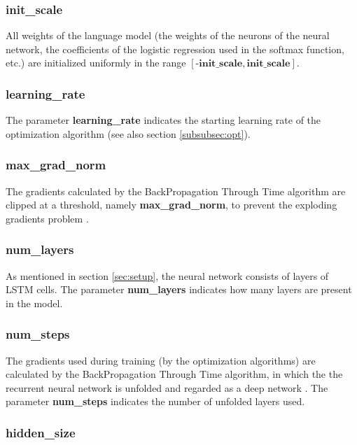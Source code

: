\documentclass[10pt,a4paper,titlepage]{article}
\begin{document}
\subsubsection{init\_scale}
	
All weights of the language model (the weights of the neurons of the neural network, the coefficients of the logistic regression used in the softmax function, etc.) are initialized uniformly in the range $[\textbf{-init\_scale},\textbf{init\_scale}]$.

\subsubsection{learning\_rate}

The parameter \textbf{learning\_rate} indicates the starting learning rate of the optimization algorithm (see also section \ref{subsubsec:opt}).

\subsubsection{max\_grad\_norm}

The gradients calculated by the BackPropagation Through Time algorithm are clipped at a threshold, namely \textbf{max\_grad\_norm}, to prevent the exploding gradients problem \cite{bptt,exp}.

\subsubsection{num\_layers}

As mentioned in section \ref{sec:setup}, the neural network consists of layers of LSTM cells. The parameter \textbf{num\_layers} indicates how many layers are present in the model.

\subsubsection{num\_steps}
\label{subsubsec:numsteps}

The gradients used during training (by the optimization algorithms) are calculated by the BackPropagation Through Time algorithm, in which the the recurrent neural network is unfolded and regarded as a deep network \cite{bptt}. The parameter \textbf{num\_steps} indicates the number of unfolded layers used.

\subsubsection{hidden\_size}
\end{document}
